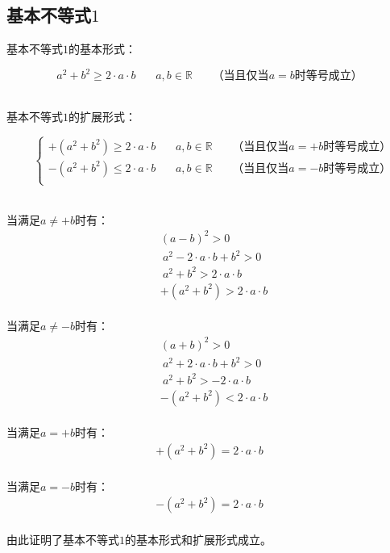\documentclass[UTF8]{ctexart}
\begin{document}
\newpage

\subsection{基本不等式$1$}
    基本不等式$1$的基本形式：
    \begin{large}
        \begin{equation*}
            a^2+b^2 \geq 2\cdot a\cdot b~~~~~~~~a,b\in\mathbb{R}~~~~~~~~\text{（当且仅当$a=b$时等号成立）}
        \end{equation*}
    \end{large}\\
    基本不等式$1$的扩展形式：\vspace{3pt}
    \begin{large}
        \begin{equation*}
            ~~~~
            \begin{cases}
                +(a^2+b^2)\geq 2\cdot a\cdot b~~~~~~~~a,b\in\mathbb{R}~~~~~~~~\text{（当且仅当$a=+b$时等号成立）}\\[1mm]
                -(a^2+b^2)\leq 2\cdot a\cdot b~~~~~~~~a,b\in\mathbb{R}~~~~~~~~\text{（当且仅当$a=-b$时等号成立）}\\[1mm]
            \end{cases}
        \end{equation*}
    \end{large}\\[5mm]
    当满足$a\neq +b$时有：
    \setcounter{equation}{0}
    \begin{align}
        &(a-b)^2>0\\[2mm]
        &~a^2-2\cdot a\cdot b+b^2>0\\[2mm]
        &~a^2+b^2>2\cdot a\cdot b\\[2mm]
        &+(a^2+b^2)>2\cdot a\cdot b
    \end{align}\\
    当满足$a\neq -b$时有：
    \begin{align}
        &(a+b)^2>0\\[2mm]
        &~a^2+2\cdot a\cdot b+b^2>0\\[2mm]
        &~a^2+b^2>-2\cdot a\cdot b\\[2mm]
        &-(a^2+b^2)<2\cdot a\cdot b
    \end{align}\\
    当满足$a=+b$时有：
    \begin{align}
        +(a^2+b^2)=2\cdot a\cdot b
    \end{align}\\
    当满足$a=-b$时有：
    \begin{align}
        -(a^2+b^2)=2\cdot a\cdot b
    \end{align}\\
    由此证明了基本不等式$1$的基本形式和扩展形式成立。
\end{document}
